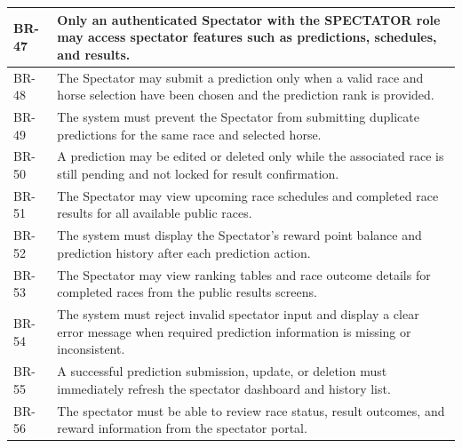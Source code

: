 \begin{table}[H]
    \centering
    \begin{tabular}{|l|p{12cm}|}
        \hline
        BR-47 & Only an authenticated Spectator with the SPECTATOR role may access spectator features such as predictions, schedules, and results. \\ 
        \hline
        BR-48 & The Spectator may submit a prediction only when a valid race and horse selection have been chosen and the prediction rank is provided. \\ 
        \hline
        BR-49 & The system must prevent the Spectator from submitting duplicate predictions for the same race and selected horse. \\ 
        \hline
        BR-50 & A prediction may be edited or deleted only while the associated race is still pending and not locked for result confirmation. \\ 
        \hline
        BR-51 & The Spectator may view upcoming race schedules and completed race results for all available public races. \\ 
        \hline
        BR-52 & The system must display the Spectator's reward point balance and prediction history after each prediction action. \\ 
        \hline
        BR-53 & The Spectator may view ranking tables and race outcome details for completed races from the public results screens. \\ 
        \hline
        BR-54 & The system must reject invalid spectator input and display a clear error message when required prediction information is missing or inconsistent. \\ 
        \hline
        BR-55 & A successful prediction submission, update, or deletion must immediately refresh the spectator dashboard and history list. \\ 
        \hline
        BR-56 & The spectator must be able to review race status, result outcomes, and reward information from the spectator portal. \\ 
        \hline
    \end{tabular}
    \label{tab:spectator_business_rules}
\end{table}

